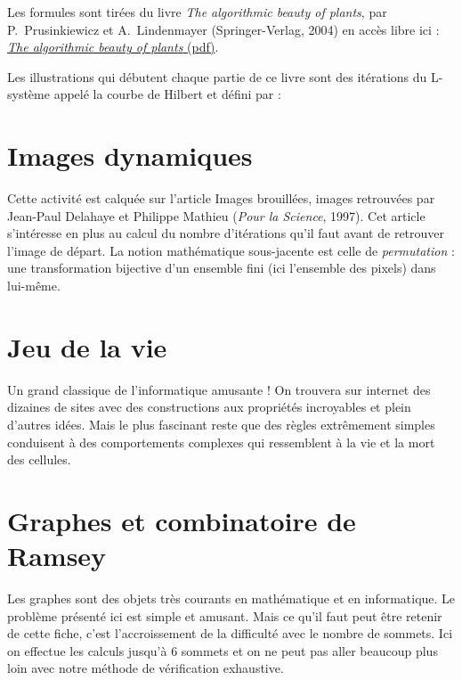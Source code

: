 \documentclass[11pt,class=report,crop=false]{standalone}
\begin{document}
Les formules sont tirées du livre \emph{The algorithmic beauty of plants}, par 
P.~Prusinkiewicz et A.~Lindenmayer (Springer-Verlag, 2004) en accès libre ici :
\href{http://algorithmicbotany.org/papers/abop/abop.pdf}{\emph{The algorithmic beauty of plants} (pdf)}.

Les illustrations qui débutent chaque partie de ce livre sont des itérations du L-système appelé la courbe de Hilbert et défini par :\\
\centerline{
\quad
{}
\quad
{}
}

\section{Images dynamiques}


Cette activité est calquée sur l'article \og{}Images brouillées, images retrouvées\fg{}
par Jean-Paul Delahaye et Philippe Mathieu (\emph{Pour la Science}, 1997). Cet article s'intéresse en plus au calcul du nombre d'itérations qu'il faut avant de retrouver l'image de départ. La notion mathématique sous-jacente est celle de \emph{permutation} : une transformation bijective d'un ensemble fini (ici l'ensemble des pixels) dans lui-même.


\section{Jeu de la vie}

Un grand classique de l'informatique amusante ! On trouvera sur internet des dizaines de sites avec des constructions aux propriétés incroyables et plein d'autres idées. Mais le plus fascinant reste que des règles extrêmement simples conduisent à des comportements complexes qui ressemblent à la vie et la mort des cellules.



\section{Graphes et combinatoire de Ramsey}

Les graphes sont des objets très courants en mathématique et en informatique.
Le problème présenté ici est simple et amusant. Mais ce qu'il faut peut être retenir de cette fiche, c'est l'accroissement de la difficulté avec le nombre de sommets. 
Ici on effectue les calculs jusqu'à $6$ sommets et on ne peut pas aller beaucoup plus loin avec notre méthode de vérification exhaustive.
\end{document}
